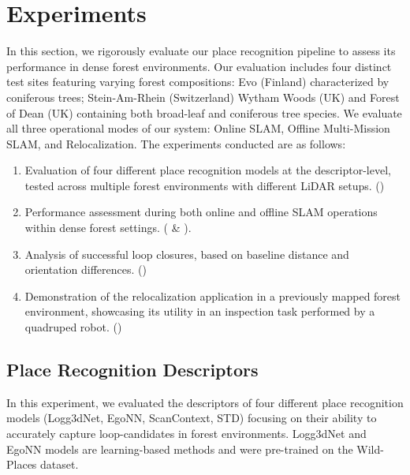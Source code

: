 \chapter{Experiments}
\label{chapter:experiments} 


In this section, we rigorously evaluate our place recognition pipeline to assess its performance in dense forest environments. Our evaluation includes four distinct test sites featuring varying forest compositions: Evo (Finland) characterized by coniferous trees; Stein-Am-Rhein (Switzerland) Wytham Woods (UK) and Forest of Dean (UK) containing both broad-leaf and coniferous tree species. We evaluate all three operational modes of our system: Online SLAM, Offline Multi-Mission SLAM, and Relocalization.
The experiments conducted are as follows:
\begin{enumerate}[label=\Roman*.]
  \item Evaluation of four different place recognition models at the descriptor-level, tested across multiple forest environments with different LiDAR setups. () 
  \item Performance assessment during both online and offline SLAM operations within dense forest settings. ( \& ). 
  \item Analysis of successful loop closures, based on baseline distance and orientation differences. ()
  \item Demonstration of the relocalization application in a previously mapped forest environment, showcasing its utility in an inspection task performed by a quadruped robot. ()
\end{enumerate}



\section{Place Recognition Descriptors}
\label{sec:exp_desc_analysis} 
In this experiment, we evaluated the descriptors of four different place recognition models (Logg3dNet, EgoNN, ScanContext, STD) focusing on their ability to accurately capture loop-candidates in forest environments. Logg3dNet and EgoNN models are learning-based methods and were pre-trained on the Wild-Places dataset. 
